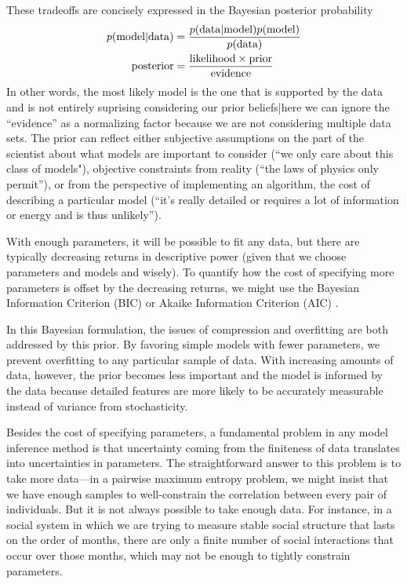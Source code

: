 \documentclass[aps,prl,twocolumn]{revtex4-1}
\begin{document}
These tradeoffs are concisely expressed in the Bayesian posterior probability
\begin{align}
	p({\rm model}|{\rm data}) &= \frac{p({\rm data}|{\rm model})p({\rm model})}{p({\rm data})}\\
	{\rm posterior} &= \frac{{\rm likelihood}\times{\rm prior}}{{\rm evidence}}
\end{align}
In other words, the most likely model is the one that is supported by the data and is not entirely suprising considering our prior beliefs|here we can ignore the ``evidence'' as a normalizing factor because we are not considering multiple data sets. The prior can reflect either subjective assumptions on the part of the scientist about what models are important to consider (``we only care about this class of models"), objective constraints from reality (``the laws of physics only permit''), or from the perspective of implementing an algorithm, the cost of describing a particular model (``it's really detailed or requires a lot of information or energy and is thus unlikely''). 

With enough parameters, it will be possible to fit any data, but there are typically decreasing returns in descriptive power (given that we choose parameters and models and wisely). 
To quantify how the cost of specifying more parameters is offset by the decreasing returns, we might use the Bayesian Information Criterion (BIC) or Akaike Information Criterion (AIC) \cite{Lee:2015ev}.

In this Bayesian formulation, the issues of compression and overfitting are both addressed by this prior. By favoring simple models with fewer parameters, we prevent overfitting to any particular sample of data. With increasing amounts of data, however, the prior becomes less important and the model is informed by the data because detailed features are more likely to be accurately measurable instead of variance from stochasticity.

Besides the cost of specifying parameters,
a fundamental problem in any model inference method is that uncertainty coming
from the finiteness of data translates into uncertainties in parameters.
The straightforward answer to this problem is to take more data---in a pairwise
maximum entropy problem, we might insist that we have enough samples to well-constrain
the correlation between every pair of individuals.  But it is not always possible
to take enough data.  For instance, in a social system in which we are trying to
measure stable social structure that lasts on the order of months, there are only
a finite number of social interactions that occur over those months, which may
not be enough to tightly constrain parameters.
\end{document}
